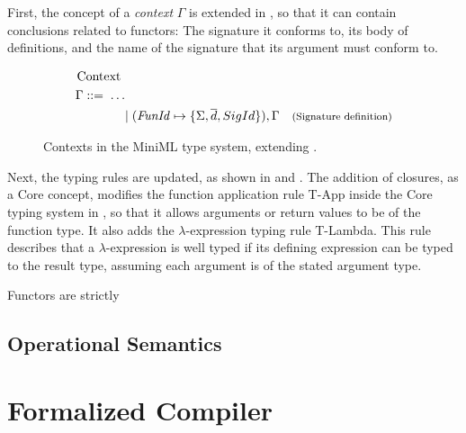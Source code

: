 First, the concept of a \emph{context} $\Gamma$ is extended in , so that it can contain conclusions related to functors: The signature it conforms to, its body of definitions, and the name of the signature that its argument must conform to.

\begin{figure}[!htb]
\begin{align*}
\begin{aligned}
\text{Context }\\
\Gamma ::=\; \ldots \\ 
&| \; (\mathit{FunId} \mapsto \lbrace \Sigma, \overline{d}, SigId\rbrace), \Gamma
                                           & \footnotesize\text{(Signature definition)}
\end{aligned}
\end{align*}
\caption[Updated Contexts]{Contexts in the MiniML type system, extending .}
\label{fig:UpdatedMiniMLContexts}
\end{figure}

Next, the typing rules are updated, as shown in  and .
The addition of closures, as a Core concept, modifies the function application rule T-App inside the Core typing system in , so that it allows arguments or return values to be of the function type.
It also adds the $\lambda$-expression typing rule T-Lambda. 
This rule describes that a $\lambda$-expression is well typed if its defining expression can be typed to the result type, assuming each argument is of the stated argument type.

Functors are strictly


\subsection{Operational Semantics}

\section{Formalized Compiler}
\label{sec:formalizedcompiler2}